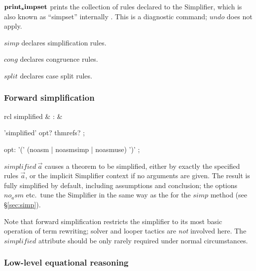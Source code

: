 \begin{descr}

\item [${\mathord{\mathbf{print_simpset}}}$] prints the collection of rules declared to
  the Simplifier, which is also known as ``simpset'' internally
  \cite{isabelle-ref}.  This is a diagnostic command; $undo$ does not apply.

\item [$simp$] declares simplification rules.

\item [$cong$] declares congruence rules.

\item [$split$] declares case split rules.

\end{descr}


\subsubsection{Forward simplification}

\begin{matharray}{rcl}
  simplified & : & \isaratt \\
\end{matharray}

\begin{rail}
  'simplified' opt? thmrefs?
  ;

  opt: '(' (noasm | noasmsimp | noasmuse) ')'
  ;
\end{rail}

\begin{descr}

\item [$simplified~\vec a$] causes a theorem to be simplified, either by
  exactly the specified rules $\vec a$, or the implicit Simplifier context if
  no arguments are given.  The result is fully simplified by default,
  including assumptions and conclusion; the options $no_asm$ etc.\ tune the
  Simplifier in the same way as the for the $simp$ method (see
  \S\ref{sec:simp}).

  Note that forward simplification restricts the simplifier to its most basic
  operation of term rewriting; solver and looper tactics \cite{isabelle-ref}
  are \emph{not} involved here.  The $simplified$ attribute should be only
  rarely required under normal circumstances.

\end{descr}


\subsubsection{Low-level equational reasoning}\label{sec:basic-eq}

